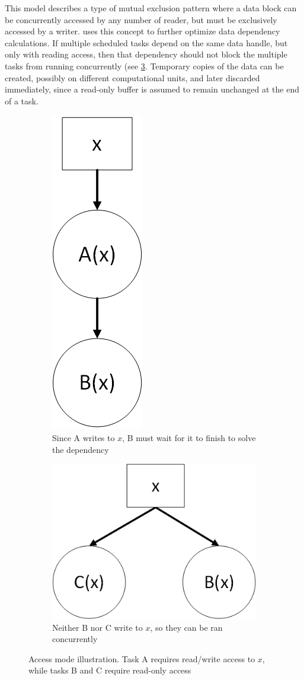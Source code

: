 \documentclass[main.tex]{subfiles}
\begin{document}
This model describes a type of mutual exclusion pattern where a data block can be concurrently accessed by any number of reader, but must be exclusively accessed by a writer. \starpu uses this concept to further optimize data dependency calculations. If multiple scheduled tasks depend on the same data handle, but only with reading access, then that dependency should not block the multiple tasks from running concurrently (see \cref{fig:starpu_dep}. Temporary copies of the data can be created, possibly on different computational units, and later discarded immediately, since a read-only buffer is assumed to remain unchanged at the end of a task.

\begin{figure}[!htp]
  \centering
  \begin{subfigure}{.5\textwidth}
    \centering
    \includegraphics[width=0.2\linewidth]{visio/starpu_dep_rw}
    \caption{Since A writes to $x$, B must wait for it to finish to solve the dependency \label{fig:starpu_dep_rw}}
  \end{subfigure}%
  \begin{subfigure}{.5\textwidth}
    \centering
    \includegraphics[width=0.6\linewidth]{visio/starpu_dep_r}
    \caption{Neither B nor C write to $x$, so they can be ran concurrently \label{fig:starpu_dep_r}}
  \end{subfigure}
  \caption{Access mode illustration. Task A requires read/write access to $x$, while tasks B and C require read-only access \label{fig:starpu_dep}}
\end{figure}
\end{document}
